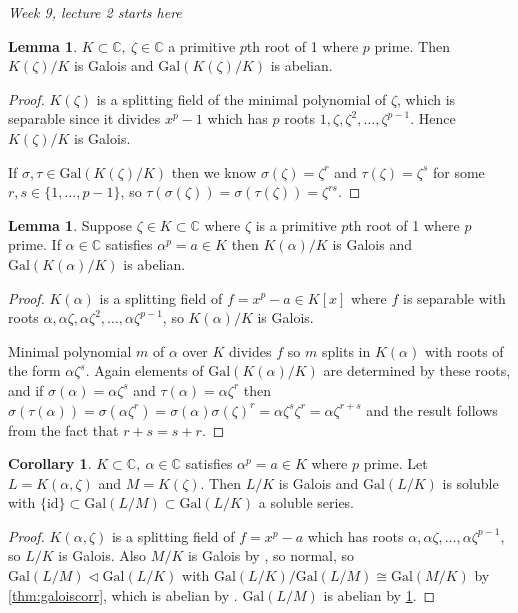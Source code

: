 \documentclass[a4paper]{article}
\newcommand{\C}{\mathbb C}
\newcommand{\gal}{\text{Gal}}
\newcommand{\id}{\text{id}}
\theoremstyle{definition}
\newtheorem{lemma}[defn]{Lemma}
\newtheorem{coro}[defn]{Corollary}
\begin{document}
\begin{flushright}
\textit{Week 9, lecture 2 starts here}
\end{flushright}

\begin{lemma}
\label{lemma:KzetaKgalabel}
$K\subset\C,\ \zeta\in\C$ a primitive $p$th root of 1 where $p$ prime. Then $K(\zeta)/K$ is Galois and $\gal(K(\zeta)/K)$ is abelian.
\end{lemma}
\begin{proof}
$K(\zeta)$ is a splitting field of the minimal polynomial of $\zeta$, which is separable since it divides $x^p-1$ which has $p$ roots $1,\zeta,\zeta^2,\ldots,\zeta^{p-1}$. Hence $K(\zeta)/K$ is Galois.

If $\sigma,\tau\in\gal(K(\zeta)/K)$ then we know $\sigma(\zeta)=\zeta^r$ and $\tau(\zeta)=\zeta^s$ for some $r,s\in\{1,\ldots,p-1\}$, so $\tau(\sigma(\zeta))=\sigma(\tau(\zeta))=\zeta^{rs}$.
\end{proof}

\begin{lemma}
\label{lemma:KalphaKgalabel}
Suppose $\zeta\in K\subset\C$ where $\zeta$ is a primitive $p$th root of 1 where $p$ prime. If $\alpha\in\C$ satisfies $\alpha^p=a\in K$ then $K(\alpha)/K$ is Galois and $\gal(K(\alpha)/K)$ is abelian.
\end{lemma}
\begin{proof}
$K(\alpha)$ is a splitting field of $f=x^p-a\in K[x]$ where $f$ is separable with roots $\alpha,\alpha\zeta,\alpha\zeta^2,\ldots,\alpha\zeta^{p-1}$, so $K(\alpha)/K$ is Galois.

Minimal polynomial $m$ of $\alpha$ over $K$ divides $f$ so $m$ splits in $K(\alpha)$ with roots of the form $\alpha\zeta^s$. Again elements of $\gal(K(\alpha)/K)$ are determined by these roots, and if $\sigma(\alpha)=\alpha\zeta^s$ and $\tau(\alpha)=\alpha\zeta^r$ then $\sigma(\tau(\alpha))=\sigma(\alpha\zeta^r)=\sigma(\alpha)\sigma(\zeta)^r=\alpha\zeta^s\zeta^r=\alpha\zeta^{r+s}$ and the result follows from the fact that $r+s=s+r$.
\end{proof}

\begin{coro}
$K\subset\C,\ \alpha\in\C$ satisfies $\alpha^p=a\in K$ where $p$ prime. Let $L=K(\alpha,\zeta)$ and $M=K(\zeta)$. Then $L/K$ is Galois and $\gal(L/K)$ is soluble with $\{\id\}\subset\gal(L/M)\subset \gal(L/K)$ a soluble series.
\end{coro}
\begin{proof}
$K(\alpha,\zeta)$ is a splitting field of $f=x^p-a$ which has roots $\alpha,\alpha\zeta,\ldots,\alpha\zeta^{p-1}$, so $L/K$ is Galois. Also $M/K$ is Galois by \label{lemma:KzetaKgalabel}, so normal, so $\gal(L/M)\lhd\gal(L/K)$ with $\gal(L/K)/\gal(L/M)\cong\gal(M/K)$ by \ref{thm:galoiscorr}, which is abelian by \label{lemma:KzetaKgalabel}. $\gal(L/M)$ is abelian by \ref{lemma:KalphaKgalabel}.
\end{proof}
\end{document}
